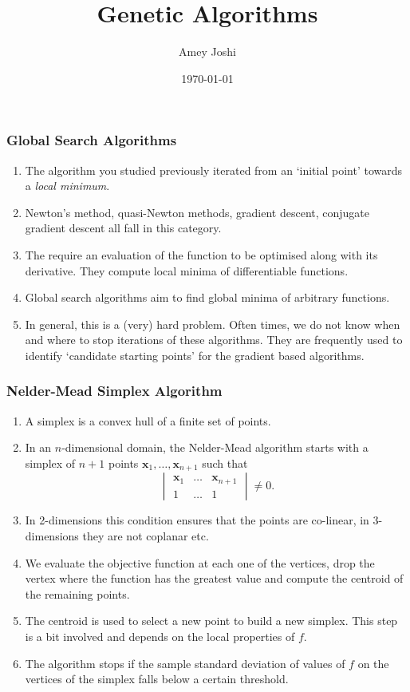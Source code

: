 \documentclass{beamer}
\title{Genetic Algorithms}
\author{Amey Joshi}
\date{\today}
\begin{document}
\begin{frame}
\titlepage
\end{frame}

\begin{frame}
\frametitle{Global Search Algorithms}
\begin{enumerate}
\item The algorithm you studied previously iterated from an `initial point'
towards a \emph{local minimum}. 
\item Newton's method, quasi-Newton methods, gradient descent, conjugate 
gradient descent all fall in this category.
\item The require an evaluation of the function to be optimised along with its
derivative. They compute local minima of differentiable functions.
\item Global search algorithms aim to find global minima of arbitrary functions.
\item In general, this is a (very) hard problem. Often times, we do not know 
when and where to stop iterations of these algorithms. They are frequently used
to identify `candidate starting points' for the gradient based algorithms.
\end{enumerate}
\end{frame}

\begin{frame}
\frametitle{Nelder-Mead Simplex Algorithm}
\begin{enumerate}
\item A simplex is a convex hull of a finite set of points. 
\item In an $n$-dimensional domain, the Nelder-Mead algorithm starts with a 
simplex of $n + 1$ points $\bm{x}_1, \ldots, \bm{x}_{n+1}$ such that
\begin{equation}\label{e1}
\begin{vmatrix}
\bm{x}_1 & \ldots & \bm{x}_{n+1} \\
1 & \ldots & 1
\end{vmatrix} \ne 0.
\end{equation}
\item In 2-dimensions this condition ensures that the points are co-linear, in
3-dimensions they are not coplanar etc.
\item We evaluate the objective function at each one of the vertices, drop the 
vertex where the function has the greatest value and compute the centroid of 
the remaining points. 
\item The centroid is used to select a new point to build a new simplex. This
step is a bit involved and depends on the local properties of $f$.
\item The algorithm stops if the sample standard deviation of values of $f$
on the vertices of the simplex falls below a certain threshold.
\end{enumerate}
\end{frame}
\end{document}
